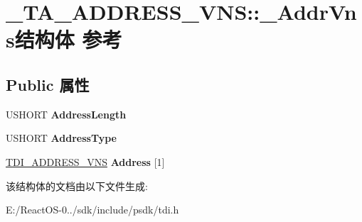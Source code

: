 \hypertarget{struct___t_a___a_d_d_r_e_s_s___v_n_s_1_1___addr_vns}{}\section{\+\_\+\+T\+A\+\_\+\+A\+D\+D\+R\+E\+S\+S\+\_\+\+V\+NS\+:\+:\+\_\+\+Addr\+Vns结构体 参考}
\label{struct___t_a___a_d_d_r_e_s_s___v_n_s_1_1___addr_vns}
\subsection*{Public 属性}
\begin{DoxyCompactItemize}
\item 
\mbox{\label{struct___t_a___a_d_d_r_e_s_s___v_n_s_1_1___addr_vns_a33c43085398103926cbac56acdfa635e}} 
U\+S\+H\+O\+RT {\bfseries Address\+Length}
\item 
\mbox{\label{struct___t_a___a_d_d_r_e_s_s___v_n_s_1_1___addr_vns_adce0fb6a9d04888f6ad4bd7d26979610}} 
U\+S\+H\+O\+RT {\bfseries Address\+Type}
\item 
\mbox{\label{struct___t_a___a_d_d_r_e_s_s___v_n_s_1_1___addr_vns_a21b4a27651ef26f47ff0e28ca8649f5f}} 
\hyperlink{struct___t_d_i___a_d_d_r_e_s_s___v_n_s}{T\+D\+I\+\_\+\+A\+D\+D\+R\+E\+S\+S\+\_\+\+V\+NS} {\bfseries Address} \mbox{[}1\mbox{]}
\end{DoxyCompactItemize}


该结构体的文档由以下文件生成\+:\begin{DoxyCompactItemize}
\item 
E\+:/\+React\+O\+S-\/0../sdk/include/psdk/tdi.\+h\end{DoxyCompactItemize}

